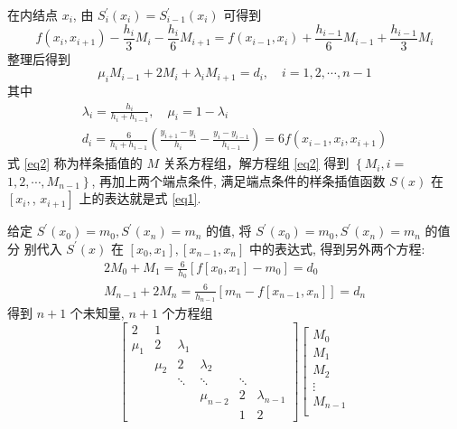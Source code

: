\documentclass[12pt,a4paper,UTF8]{ctexart}
\begin{document}
\begin{enumerate}
\begin{enumerate}
在内结点 $x_{i}$, 由 $S_{i}^{\prime}\left(x_{i}\right)=S_{i-1}^{\prime}\left(x_{i}\right)$ 可得到
\begin{equation}\label{eq2}
f\left(x_{i}, x_{i+1}\right)-\frac{h_{i}}{3} M_{i}-\frac{h_{i}}{6} M_{i+1}=f\left(x_{i-1}, x_{i}\right)+\frac{h_{i-1}}{6} M_{i-1}+\frac{h_{i-1}}{3} M_{i}
\end{equation}
整理后得到
$$
\mu_{i} M_{i-1}+2 M_{i}+\lambda_{i} M_{i+1}=d_{i}, \quad i=1,2, \cdots, n-1
$$
其中
$$
\begin{array}{c}
\lambda_{i}=\frac{h_{i}}{h_{i}+h_{i-1}}, \quad \mu_{i}=1-\lambda_{i} \\
d_{i}=\frac{6}{h_{i}+h_{i-1}}\left(\frac{y_{i+1}-y_{i}}{h_{i}}-\frac{y_{i}-y_{i-1}}{h_{i-1}}\right)=6 f\left(x_{i-1}, x_{i}, x_{i+1}\right)
\end{array}
$$
式 \ref{eq2} 称为样条插值的 $M$ 关系方程组，解方程组 \ref{eq2} 得到 $\left\{M_{i}, i=\right.$ $\left.1,2, \cdots, M_{n-1}\right\}$, 再加上两个端点条件, 满足端点条件的样条插值函数 $S(x)$ 在 $\left[x_{i},\right.$, $\left.x_{i+1}\right]$ 上的表达就是式 \ref{eq1}.
\par 给定 $S^{\prime}\left(x_{0}\right)=m_{0}, S^{\prime}\left(x_{n}\right)=m_{n}$ 的值, 将 $S^{\prime}\left(x_{0}\right)=m_{0}, S^{\prime}\left(x_{n}\right)=m_{n}$ 的值分
别代入 $S^{\prime}(x)$ 在 $\left[x_{0}, x_{1}\right],\left[x_{n-1}, x_{n}\right]$ 中的表达式, 得到另外两个方程:
$$
\begin{array}{c}
2 M_{0}+M_{1}=\frac{6}{h_{0}}\left[f\left[x_{0}, x_{1}\right]-m_{0}\right]=d_{0} \\
M_{n-1}+2 M_{n}=\frac{6}{h_{n-1}}\left[m_{n}-f\left[x_{n-1}, x_{n}\right]\right]=d_{n}
\end{array}
$$
得到 $n+1$ 个未知量, $n+1$ 个方程组
$$
\left[\begin{array}{cccccc}
2 & 1 & & & & \\
\mu _{1} & 2 & \lambda_{1} & & & \\
& \mu _{2} & 2 & \lambda_{2} & & \\
& & \ddots & \ddots & \ddots & \\
& & & \mu _{n-2} & 2 & \lambda_{n-1} \\
& & & & 1 & 2
\end{array}\right]\left[\begin{array}{c}
M_{0} \\
M_{1} \\
M_{2} \\
\vdots \\
M_{n-1} \\

\end{array}$$
\end{enumerate}
\end{enumerate}
\end{document}

